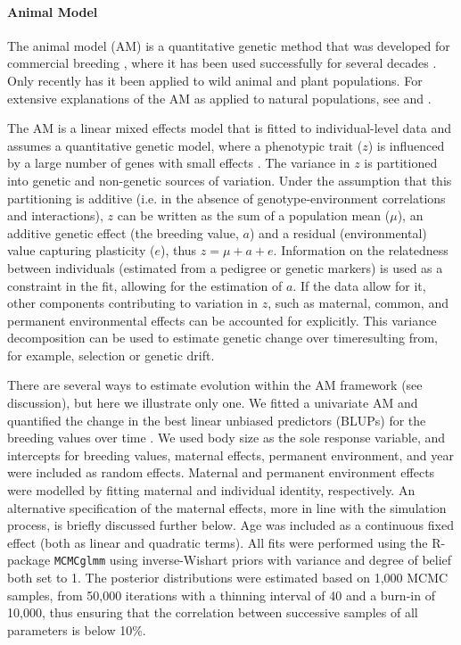 \paragraph{Animal Model} 
The animal model (AM) is a quantitative genetic method that was developed for commercial breeding \parencite{Henderson1950,Henderson1976}, where it has been used successfully for several decades \parencite[e.g.][]{Lynch1998}. Only recently has it been applied to wild animal \parencite[e.g.][]{Reale2003,Postma2014} and plant \parencite{Stinchcombe2014} populations. For extensive explanations of the AM as applied to natural populations, see \cite{Kruuk2004} and \cite{Wilson2009}. 

The AM is a linear mixed effects model that is fitted to individual-level data and assumes a quantitative genetic model, where a phenotypic trait ($z$) is influenced by a large number of genes with small effects \parencite{Roff2007}. The variance in $z$ is partitioned into genetic and non-genetic sources of variation. Under the assumption that this partitioning is additive (i.e. in the absence of genotype-environment correlations and interactions), $z$ can be written as the sum of a population mean ($\mu$), an additive genetic effect (the breeding value, $a$) and a residual (environmental) value capturing plasticity ($e$), thus $z=\mu+a+e$. Information on the relatedness between individuals (estimated from a pedigree or genetic markers) is used as a constraint in the fit, allowing for the estimation of $a$. If the data allow for it, other components contributing to variation in $z$, such as maternal, common, and permanent environmental effects can be accounted for explicitly. This variance decomposition can be used to estimate genetic change over time\textemdash resulting from, for example, selection or genetic drift. 

There are several ways to estimate evolution within the AM framework (see discussion), but here we illustrate only one. We fitted a univariate AM and quantified the change in the best linear unbiased predictors (BLUPs) for the breeding values over time \parencite[][]{Postma2006,Hadfield2010b}. We used body size as the sole response variable, and intercepts for breeding values, maternal effects, permanent environment, and year were included as random effects. Maternal and permanent environment effects were modelled by fitting maternal and individual identity, respectively. An alternative specification of the maternal effects, more in line with the simulation process, is briefly discussed further below. Age was included as a continuous fixed effect (both as linear and quadratic terms). All fits were performed using the R-package \texttt{MCMCglmm} \parencite{Hadfield2010a} using inverse-Wishart priors with variance and degree of belief both set to 1. The posterior distributions were estimated based on 1,000 MCMC samples, from 50,000 iterations with a thinning interval of 40 and a burn-in of 10,000, thus ensuring that the correlation between successive samples of all parameters is below 10\%. 

